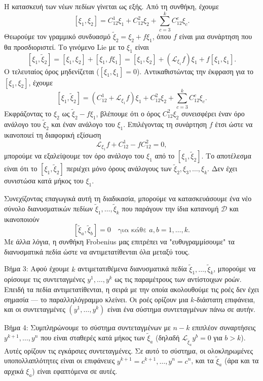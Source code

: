 \documentclass[12pt]{article}
\begin{document}
Η κατασκευή των νέων πεδίων γίνεται ως εξής. Από τη συνθήκη, έχουμε
\[
[\xi_1, \xi_2] = C_{12}^1 \xi_1 + C_{12}^2 \xi_2 + \sum_{c=3}^k C_{12}^c \xi_c.
\]
Θεωρούμε τον γραμμικό συνδυασμό $\tilde{\xi}_2 = \xi_2 + f \xi_1$, όπου $f$ είναι μια συνάρτηση που θα προσδιοριστεί. Το γινόμενο Lie με το $\xi_1$ είναι
\[
[\xi_1, \tilde{\xi}_2] = [\xi_1, \xi_2] + [\xi_1, f \xi_1] = [\xi_1, \xi_2] + (\mathcal{L}_{\xi_1} f) \xi_1 + f [\xi_1, \xi_1].
\]
Ο τελευταίος όρος μηδενίζεται ($[\xi_1, \xi_1] = 0$). Αντικαθιστώντας την έκφραση για το $[\xi_1, \xi_2]$, έχουμε
\[
[\xi_1, \tilde{\xi}_2] = (C_{12}^1 + \mathcal{L}_{\xi_1} f) \xi_1 + C_{12}^2 \xi_2 + \sum_{c=3}^k C_{12}^c \xi_c.
\]
Εκφράζοντας το $\xi_2$ ως $\tilde{\xi}_2 - f \xi_1$, βλέπουμε ότι ο όρος $C_{12}^2 \xi_2$ συνεισφέρει έναν όρο ανάλογο του $\tilde{\xi}_2$ και έναν ανάλογο του $\xi_1$. Επιλέγοντας τη συνάρτηση $f$ έτσι ώστε να ικανοποιεί τη διαφορική εξίσωση
\[
\mathcal{L}_{\xi_1} f + C_{12}^1 - f C_{12}^2 = 0,
\]
μπορούμε να εξαλείψουμε τον όρο ανάλογο του $\xi_1$ από το $[\xi_1, \tilde{\xi}_2]$. Το αποτέλεσμα είναι ότι το $[\xi_1, \tilde{\xi}_2]$ περιέχει μόνο όρους ανάλογους των $\tilde{\xi}_2, \xi_3, \dots, \xi_k$. Δεν έχει συνιστώσα κατά μήκος του $\xi_1$.

Συνεχίζοντας επαγωγικά αυτή τη διαδικασία, μπορούμε να κατασκευάσουμε ένα νέο σύνολο διανυσματικών πεδίων $\tilde{\xi}_1, \dots, \tilde{\xi}_k$ που παράγουν την ίδια κατανομή $\mathcal{D}$ και ικανοποιούν
\[
[\tilde{\xi}_a, \tilde{\xi}_b] = 0 \quad \text{για κάθε } a, b = 1, \dots, k.
\]
Με άλλα λόγια, η συνθήκη Frobenius μας επιτρέπει να "ευθυγραμμίσουμε" τα διανυσματικά πεδία ώστε να αντιμετατίθενται όλα μεταξύ τους.

Βήμα 3: Αφού έχουμε $k$ αντιμετατιθέμενα διανυσματικά πεδία $\tilde{\xi}_1, \dots, \tilde{\xi}_k$, μπορούμε να ορίσουμε τις συντεταγμένες $y^1, \dots, y^k$ ως τις παραμέτρους των αντίστοιχων ροών. Επειδή τα πεδία αντιμετατίθενται, η σειρά με την οποία ακολουθούμε τις ροές δεν έχει σημασία — το παραλληλόγραμμο κλείνει. Οι ροές ορίζουν μια $k$-διάστατη επιφάνεια, και οι συντεταγμένες $(y^1, \dots, y^k)$ είναι ένα σύστημα συντεταγμένων πάνω σε αυτήν.

Βήμα 4: Συμπληρώνουμε το σύστημα συντεταγμένων με $n-k$ επιπλέον συναρτήσεις $y^{k+1}, \dots, y^n$ που είναι σταθερές κατά μήκος των $\tilde{\xi}_a$ (δηλαδή $\mathcal{L}_{\tilde{\xi}_a} y^{b} = 0$ για $b > k$). Αυτές ορίζουν τις εγκάρσιες συντεταγμένες. Σε αυτό το σύστημα, οι ολοκληρωμένες υποπολλαπλότητες είναι οι επιφάνειες $y^{k+1} = c^{k+1}, \dots, y^n = c^n$, και τα $\tilde{\xi}_a$ (άρα και τα αρχικά $\xi_a$) είναι εφαπτόμενα σε αυτές.
\end{document}
